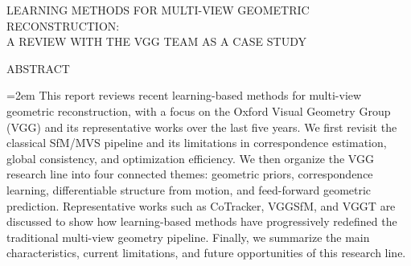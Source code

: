 \documentclass[12pt,a4paper,fleqn]{ctexart}
\numberwithin{equation}{section}
\begin{document}
\par{}
\endgroup

\clearpage
{}
\begin{center}
  {\TimesNewRoman{} LEARNING METHODS FOR MULTI-VIEW GEOMETRIC RECONSTRUCTION:}\\
  \vspace{0.2cm}
  {\TimesNewRoman{} A REVIEW WITH THE VGG TEAM AS A CASE STUDY}
\end{center}

\begin{center}
  {\TimesNewRoman{} ABSTRACT}
\end{center}
\begingroup
\TimesNewRoman{}
\parindent=2em
This report reviews recent learning-based methods for multi-view geometric reconstruction, with a focus on the Oxford Visual Geometry Group (VGG) and its representative works over the last five years. We first revisit the classical SfM/MVS pipeline and its limitations in correspondence estimation, global consistency, and optimization efficiency. We then organize the VGG research line into four connected themes: geometric priors, correspondence learning, differentiable structure from motion, and feed-forward geometric prediction. Representative works such as CoTracker, VGGSfM, and VGGT are discussed to show how learning-based methods have progressively redefined the traditional multi-view geometry pipeline. Finally, we summarize the main characteristics, current limitations, and future opportunities of this research line.

\par{}
\endgroup

\clearpage
\begingroup
\songti\TimesNewRoman{}
\tableofcontents
\endgroup

\clearpage
\songti{}
\setlength{\parindent}{2em}
\setlength{\parskip}{0pt}







\clearpage
\printbibliography[heading=custombib,title={参考文献}]
\end{document}
